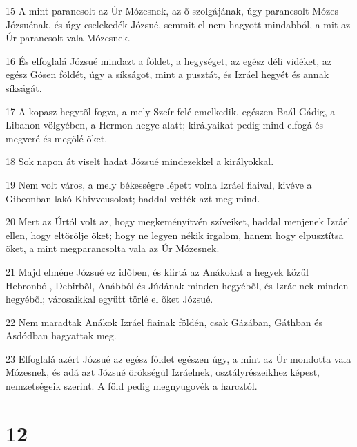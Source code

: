\par 15 A mint parancsolt az Úr Mózesnek, az õ szolgájának, úgy parancsolt Mózes  Józsuénak, és úgy cselekedék Józsué, semmit el nem hagyott mindabból, a mit az Úr parancsolt vala Mózesnek.
\par 16 És elfoglalá Józsué mindazt a földet, a hegységet, az egész déli vidéket, az egész Gósen földét, úgy a síkságot, mint a pusztát, és Izráel hegyét és annak síkságát.
\par 17 A kopasz hegytõl fogva, a mely Szeír felé emelkedik, egészen Baál-Gádig, a Libanon völgyében, a Hermon hegye alatt; királyaikat pedig mind elfogá és megveré és megölé õket.
\par 18 Sok napon át viselt hadat Józsué mindezekkel a királyokkal.
\par 19 Nem volt város, a mely békességre lépett volna Izráel fiaival, kivéve a Gibeonban lakó Khivveusokat; haddal vették azt meg mind.
\par 20 Mert az Úrtól volt az, hogy megkeményítvén szíveiket, haddal menjenek Izráel ellen, hogy eltörölje õket; hogy ne legyen nékik irgalom, hanem hogy elpusztítsa õket, a mint megparancsolta vala az Úr Mózesnek.
\par 21 Majd elméne Józsué ez idõben, és kiirtá az Anákokat a hegyek közül Hebronból, Debirbõl, Anábból és Júdának minden hegyébõl, és Izráelnek minden hegyébõl; városaikkal együtt törlé el õket Józsué.
\par 22 Nem maradtak Anákok Izráel fiainak földén, csak Gázában, Gáthban és Asdódban hagyattak meg.
\par 23 Elfoglalá azért Józsué az egész földet egészen úgy, a mint az Úr mondotta vala Mózesnek, és adá azt Józsué örökségül Izráelnek, osztályrészeikhez képest, nemzetségeik szerint. A föld pedig megnyugovék a harcztól.

\chapter{12}

